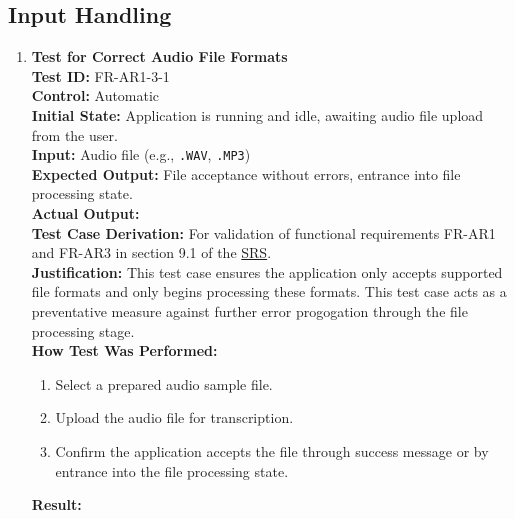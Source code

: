 \documentclass[12pt, titlepage]{article}
\begin{document}
  \subsection{Input Handling}
  \begin{enumerate}
    \item \textbf{Test for Correct Audio File Formats} \\
      \newline
      \textbf{Test ID:} FR-AR1-3-1 \\
      \textbf{Control:} Automatic \\
      \textbf{Initial State:} Application is running and idle, awaiting audio file upload from the user. \\
      \textbf{Input:} Audio file (e.g., \texttt{.WAV}, \texttt{.MP3}) \\
      \textbf{Expected Output:} File acceptance without errors, entrance into file processing state. \\
      \textbf{Actual Output:} \\
      \textbf{Test Case Derivation:} For validation of functional requirements FR-AR1 and FR-AR3 in section 9.1 of the 
      \href{https://github.com/emilyperica/ScoreGen/blob/main/docs/SRS-Volere/SRS.pdf}{SRS}. \\
      \textbf{Justification:} This test case ensures the application only accepts supported file formats and only begins processing 
      these formats. This test case acts as a preventative measure against further error progogation through the file processing stage.\\
      \textbf{How Test Was Performed:}
      \begin{enumerate}
          \item Select a prepared audio sample file.
          \item Upload the audio file for transcription.
          \item Confirm the application accepts the file through success message or by entrance into the file processing state.
      \end{enumerate}
      \textbf{Result:}
  

\end{enumerate}
\end{document}

